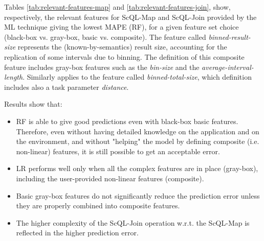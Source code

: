 \documentclass[a4paper, 10pt, conference]{ieeeconf}      %
\begin{document}
\noindent Tables \ref{tab:relevant-features-map} and  \ref{tab:relevant-features-join}, show, respectively, the relevant features for ScQL-Map and ScQL-Join provided by the ML technique giving the lowest MAPE (RF), for a given feature set choice (black-box vs. gray-box, basic vs. composite).
The feature called \textit{binned-result-size} represents the (known-by-semantics) result size, accounting for the replication of some intervals due to binning. The definition of this composite feature includes gray-box features such as the \textit{bin-size} and the \textit{average-interval-length}.
Similarly applies to the feature called \textit{binned-total-size}, which definition includes also a task parameter \textit{distance}.

\noindent Results show that:
\begin{itemize}
    \item RF is able to give good predictions even with black-box basic features. Therefore,  even without having detailed knowledge on the application and on the environment, and without "helping" the model by defining composite (i.e. non-linear) features, it is still possible to get an acceptable error. 
    \item LR performs well only when all the complex  features are in place (gray-box), including the user-provided non-linear features (composite). 
    \item Basic gray-box features do not significantly reduce the prediction error unless they are properly combined into composite features. 
    \item The higher complexity of the ScQL-Join operation w.r.t. the ScQL-Map is reflected in the higher prediction error.
    \color{black}
    \color{black}
\end{itemize}
\end{document}
